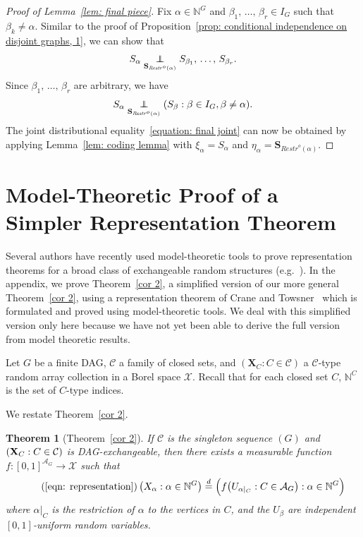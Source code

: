 \documentclass[10pt]{amsart}
\newtheorem{theo}{Theorem}[section]
\theoremstyle{definition}\newtheorem{defi}[theo]{Definition}\newtheorem{rema}[theo]{Remark}\newtheorem{exam}[theo]{Example}\newtheorem{exem}[theo]{Example}\newtheorem{nota}[theo]{Notation}
\newcommand{\independent}{\protect\mathpalette{\protect\independenT}{\perp}}\def\independenT#1#2{\mathrel{\rlap{$#1#2$}\mkern2mu{#1#2}}}
\newcommand{\alf}{\alpha}%
\newcommand*\bb{\beta}
\newcommand{\indices}[1]{\mathbb{N}^{#1}}
\renewcommand{\d}{\buildrel{d}\over{=}}
\newcommand*\srstr{\mathit{Restr}^o}
\newcommand*\N{\mathbb{N}}
\renewcommand{\AA}{\mathcal{A}}
\newcommand*\CC{{\mathcal{C}}}
\newcommand*\XX{{\mathcal{X}}}
\newcommand*\bS{\mathbf{S}}
\newcommand*\bX{\mathbf{X}}
\begin{document}
\begin{proof}[Proof of Lemma~\ref{lem: final piece}] Fix $\alf \in \N^G$ and $\bb_1,\,\ldots,\,\bb_r \in I_G$ such that $\bb_k \neq \alf$. Similar to the proof of Proposition~\ref{prop: conditional independence on disjoint graphs, 1}, we can show that
\[
S_\alf \underset{\bS_{\srstr(\alf)}}{\independent} S_{\bb_1},\,\ldots,\,S_{\bb_r}.
\]
Since $\bb_1,\,\ldots,\,\bb_r$ are arbitrary, we have
\[
S_\alf \underset{\bS_{\srstr(\alf)}}{\independent} (S_\bb : \bb\in I_G, \bb\neq \alf).
\]
The joint distributional equality~\eqref{equation: final joint} can now be obtained by applying Lemma~\ref{lem: coding lemma} with $\xi_\alf=S_\alf$ and $\eta_\alf=\bS_{\srstr(\alf)}$.
\end{proof}



\appendix

\section{Model-Theoretic Proof of a Simpler Representation Theorem}\label{app:model-theoretic-proof}

Several authors have recently used model-theoretic tools to prove representation theorems for a broad class of exchangeable random structures (e.g.~\cite{ackerman2015,ackermanetal-forum-2016,crane2017relative,crane2018relatively}). In the appendix, we prove Theorem~\ref{cor 2}, a simplified version of our more general Theorem~\ref{cor 2}, using a representation theorem of Crane and Towsner~\cite{crane2017relative} which is formulated and proved using model-theoretic tools. We deal with this simplified version only here because we have not yet been able to derive the full version from model theoretic results.

Let $G$ be a finite DAG, $\CC$ a family of closed sets, and ${(\bX_C : C \in \CC)}$ a $\CC$-type random array collection in a Borel space $\XX$. Recall that for each closed set $C$, $\indices C$ is the set of $C$-type indices.

We restate Theorem~\ref{cor 2}.

\begin{theo}[{Theorem~\ref{cor 2}}]
If $\CC$ is the singleton sequence $(G)$ and $(\bX_C : C\linebreak\in \CC)$ is DAG-exchangeable, then there exists a measurable function $f: [0,1]^{\AA_G} \to \XX$ such that
\begin{equation}
\tag{\ref{eqn: representation}}\left(X_\alpha : \alpha \in \indices G\right) \d \Big(f\big(U_{\alpha|_C} : C \in \AA_G\big) : \alpha \in \indices G\Big)
\end{equation}
where $\alpha|_C$ is the restriction of $\alpha$ to the vertices in $C$, and the $U_\beta$ are independent\linebreak$[0,1]$-uniform random variables. 
\end{theo}
\end{document}
